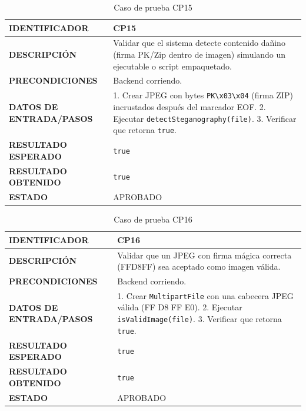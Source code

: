 \begin{table}[H]
\centering
\caption{Caso de prueba CP15}
\begin{tabular}{|p{3.5cm}|p{10.3cm}|}
\hline
\textbf{IDENTIFICADOR} & CP15 \\
\hline
\textbf{DESCRIPCIÓN} & Validar que el sistema detecte contenido dañino (firma PK/Zip dentro de imagen) simulando un ejecutable o script empaquetado. \\
\hline
\textbf{PRECONDICIONES} & Backend corriendo. \\
\hline
\textbf{DATOS DE ENTRADA/PASOS} & 1. Crear JPEG con bytes \texttt{PK\textbackslash x03\textbackslash x04} (firma ZIP) incrustados después del marcador EOF. 2. Ejecutar \texttt{detectSteganography(file)}. 3. Verificar que retorna \texttt{true}. \\
\hline
\textbf{RESULTADO ESPERADO} & \texttt{true} \\
\hline
\textbf{RESULTADO OBTENIDO} & \texttt{true} \\
\hline
\textbf{ESTADO} & APROBADO \\
\hline
\end{tabular}
\end{table}

\begin{table}[H]
\centering
\caption{Caso de prueba CP16}
\begin{tabular}{|p{3.5cm}|p{10.3cm}|}
\hline
\textbf{IDENTIFICADOR} & CP16 \\
\hline
\textbf{DESCRIPCIÓN} & Validar que un JPEG con firma mágica correcta (FFD8FF) sea aceptado como imagen válida. \\
\hline
\textbf{PRECONDICIONES} & Backend corriendo. \\
\hline
\textbf{DATOS DE ENTRADA/PASOS} & 1. Crear \texttt{MultipartFile} con una cabecera JPEG válida (FF D8 FF E0). 2. Ejecutar \texttt{isValidImage(file)}. 3. Verificar que retorna \texttt{true}. \\
\hline
\textbf{RESULTADO ESPERADO} & \texttt{true} \\
\hline
\textbf{RESULTADO OBTENIDO} & \texttt{true} \\
\hline
\textbf{ESTADO} & APROBADO \\
\hline
\end{tabular}
\end{table}

